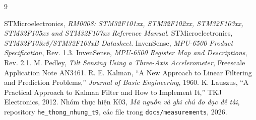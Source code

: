 \documentclass[14pt,a4paper,oneside]{extreport}
\renewcommand{\bibname}{TÀI LIỆU THAM KHẢO}}
\renewcommand{\bibname}{TÀI LIỆU THAM KHẢO}
\begin{document}
\clearpage
\renewcommand{\bibname}{TÀI LIỆU THAM KHẢO}
\begin{thebibliography}{9}\raggedright
{}
 STMicroelectronics, \emph{RM0008: STM32F101xx, STM32F102xx, STM32F103xx, STM32F105xx and STM32F107xx Reference Manual}.
 STMicroelectronics, \emph{STM32F103x8/STM32F103xB Datasheet}.
 InvenSense, \emph{MPU-6500 Product Specification}, Rev. 1.3.
 InvenSense, \emph{MPU-6500 Register Map and Descriptions}, Rev. 2.1.
 M. Pedley, \emph{Tilt Sensing Using a Three-Axis Accelerometer}, Freescale Application Note AN3461.
 R. E. Kalman, ``A New Approach to Linear Filtering and Prediction Problems,'' \emph{Journal of Basic Engineering}, 1960.
 K. Lauszus, ``A Practical Approach to Kalman Filter and How to Implement It,'' TKJ Electronics, 2012.
 Nhóm thực hiện K03, \emph{Mã nguồn và ghi chú đo đạc đề tài}, repository \texttt{he\_thong\_nhung\_t9}, các file trong \texttt{docs/measurements}, 2026.
\end{thebibliography}
\end{document}
